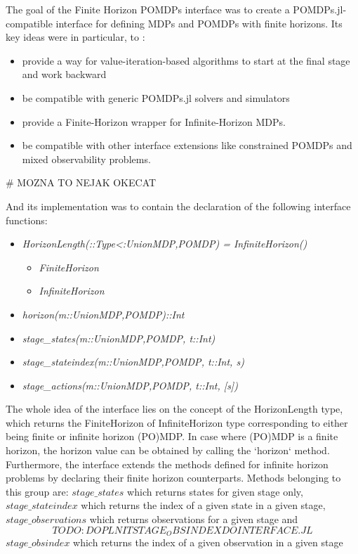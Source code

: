 The goal of the Finite Horizon POMDPs interface was to create a POMDPs.jl-compatible interface for defining MDPs and POMDPs with finite horizons. 
Its key ideas were in particular, to :
\begin{itemize}
    \item provide a way for value-iteration-based algorithms to start at the final stage and work backward
    \item be compatible with generic POMDPs.jl solvers and simulators
    \item provide a Finite-Horizon wrapper for Infinite-Horizon MDPs.
    \item be compatible with other interface extensions like constrained POMDPs and mixed observability problems.
\end{itemize}

# MOZNA TO NEJAK OKECAT

And its implementation was to contain the declaration of the following interface functions:

\begin{itemize}
    \item \textit{HorizonLength(::Type{<:Union{MDP,POMDP}}) = InfiniteHorizon()}
    \begin{itemize}
        \item \textit{FiniteHorizon}
        \item \textit{InfiniteHorizon}
    \end{itemize}
    \item \textit{horizon(m::Union{MDP,POMDP})::Int}
    \item \textit{stage\_states(m::Union{MDP,POMDP}, t::Int)}
    \item \textit{stage\_stateindex(m::Union{MDP,POMDP}, t::Int, s)}
    \item \textit{stage\_actions(m::Union{MDP,POMDP}, t::Int, [s])}
\end{itemize}

The whole idea of the interface lies on the concept of the HorizonLength type, which returns the FiniteHorizon of InfiniteHorizon type corresponding to either being finite or infinite horizon (PO)MDP. In case where (PO)MDP is a finite horizon, the horizon value can be obtained by calling the `horizon` method. Furthermore, the interface extends the methods 
defined for infinite horizon problems by declaring their finite horizon counterparts. Methods belonging to this group are: $stage\_states$  which returns states for given stage only, $stage\_stateindex$ which returns the index of a given state in a given stage, $stage\_observations$ which returns observations for a given stage and \[TODO: DOPLNIT STAGE_OBSINDEX DO INTERFACE.JL\] $stage\_obsindex$ which returns the index of a given observation in a given stage

